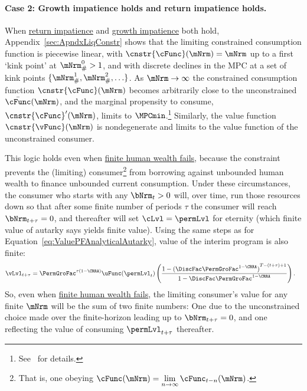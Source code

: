 \documentclass[BufferStockTheory]{subfiles}
\begin{document}
\paragraph{Case 2: Growth impatience holds and return impatience holds.}  When  \hyperlink{RIC}{return impatience} and  \hyperlink{GIC}{growth impatience} both hold, Appendix~\ref{sec:ApndxLiqConstr} shows that the limiting constrained consumption function is piecewise linear, with $\cnstr{\cFunc}(\mNrm)=\mNrm$ up to a first `kink point' at $\mNrm_{\#}^{0}>1$, and with discrete declines in the MPC at a set of kink points $\{\mNrm_{\#}^{1},\mNrm_{\#}^{2},\ldots\}$.
As $\mNrm \rightarrow \infty$ the constrained consumption function $\cnstr{\cFunc}(\mNrm)$ becomes arbitrarily close to the unconstrained $\bar{\cFunc}(\mNrm)$, and the marginal propensity to consume, $\cnstr{\cFunc}^{\prime}(\mNrm)$, limits to $\MPCmin$.\footnote{See~\cite{chkLiqConstr} for details.}  Similarly, the value function $\cnstr{\vFunc}(\mNrm)$ is nondegenerate and limits to the value function of the unconstrained consumer.


This logic holds even when \hyperlink{FHWC}{finite human wealth fails}, because the constraint prevents the (limiting) consumer\footnote{That is, one obeying $\cFunc(\mNrm) = \lim\limits_{n \rightarrow \infty} \cFunc_{t-n}(\mNrm)$.} from borrowing against unbounded human wealth to finance unbounded current consumption.
Under these circumstances, the consumer who starts with any $\bNrm_{t} > 0$ will, over time, run those resources down so that after some finite number of periods $\tau$ the consumer will reach $\bNrm_{t+\tau} = 0$, and thereafter will set $\cLvl = \permLvl$ for eternity (which \hypertarget{PFFVAC}{finite value of autarky} says yields finite value).
Using the same steps as for Equation~\eqref{eq:ValuePFAnalyticalAutarky}, value of the interim program is also finite: \hypertarget{PFFVAC}{}
\begin{align*}
  \vLvl_{t+\tau} 
  & = \PermGroFac^{\tau(1-\CRRA)} \uFunc(\permLvl_{t})\left(\frac{1-{(\DiscFac \PermGroFac^{1-\CRRA})}^{T-(t+\tau)+1}}{1-\DiscFac \PermGroFac^{1-\CRRA}}\right).
\end{align*}
So, even when \hyperlink{FHWC}{finite human wealth fails}, the limiting consumer's value for any finite $\mNrm$ will be the sum of two finite numbers: One due to the unconstrained choice made over the finite-horizon leading up to $\bNrm_{t+\tau} = 0$, and one reflecting the value of consuming $\permLvl_{t+\tau}$ thereafter.
\end{document}
